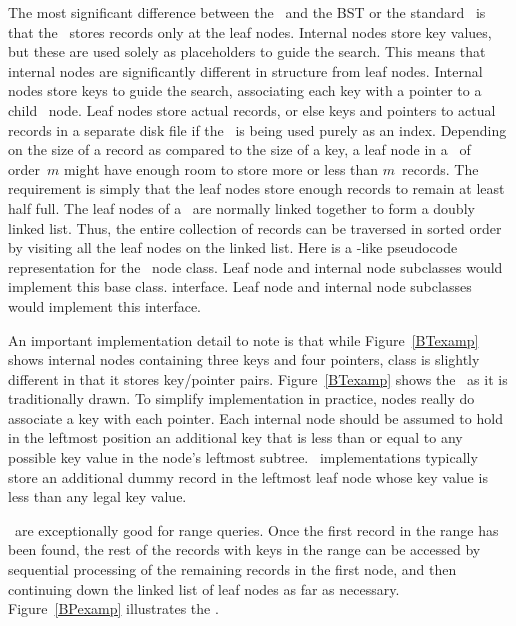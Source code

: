 The most significant difference between the \BPtree\ and the BST or
the standard \Btree\ is that
the \BPtree\ stores records only at the leaf nodes.
Internal nodes store key values, but these
are used solely as placeholders to guide the search.
This means that internal nodes are significantly different in
structure from leaf nodes.
Internal nodes store keys to guide the search, associating each key
with a pointer to a child \BPtree\ node.
Leaf nodes store actual records, or else keys and pointers to actual
records in a separate disk file if the \BPtree\ is being used
purely as an index.
Depending on the size of a record as compared to the size of a key,
a leaf node in a \BPtree\ of order~\(m\) might have enough room to
store more or less than \(m\)~records.
The requirement is simply that the leaf nodes store enough records to
remain at least half full.
The leaf nodes of a \BPtree\ are normally
linked together to form a doubly linked list.
Thus, the entire collection of records can be traversed in sorted
order by visiting all the leaf nodes on the linked list.
Here is a \Lang-like pseudocode representation for the \BPtree\ node
{class.
Leaf node and internal node subclasses would implement this base class.}{}
{interface.
Leaf node and internal node subclasses would implement this interface.}{}


An important implementation detail to note is that while
Figure~\ref{BTexamp} shows internal nodes containing three keys and
four pointers, class  is slightly different in that it
stores key/pointer pairs.
Figure~\ref{BTexamp} shows the \BPtree\ as it is traditionally drawn.
To simplify implementation in practice, nodes really do 
associate a key with each pointer.
Each internal node should be assumed to hold in the leftmost position
an additional key that is less than or equal to any possible key value
in the node's leftmost subtree.
\BPtree\ implementations typically store an additional dummy record
in the leftmost leaf node whose key value is less than any legal key
value.

\BPtrees\ are exceptionally good for range queries.
Once the first record in the range has been found, the rest of the
records with keys in the range can be accessed by sequential
processing of the remaining records in the first node, and then
continuing down the linked list of leaf nodes as far as necessary.
Figure~\ref{BPexamp} illustrates the \BPtree.

